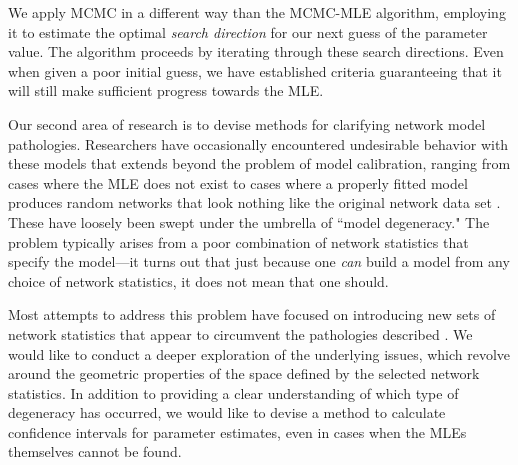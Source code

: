 \documentclass[12pt]{article}
\begin{document}
We apply MCMC in a different way than the MCMC-MLE algorithm, employing it to estimate the optimal \textit{search direction} for our next guess of the parameter value.  The algorithm proceeds by iterating through these search directions.  Even when given a poor initial guess, we have established criteria guaranteeing that it will still make sufficient progress towards the MLE.  


Our second area of research is to devise methods for clarifying network model pathologies.
Researchers have occasionally encountered undesirable behavior with these models that extends beyond the problem of model calibration, ranging from cases where the MLE does not exist to cases where a properly fitted model produces random networks that look nothing like the original network data set \citep{Rinaldo:2009}.  These have loosely been swept under the umbrella of ``model degeneracy."  The problem typically arises from a poor combination of network statistics that specify the model---it turns out that just because one \textit{can} build a model from any choice of network statistics, it does not mean that one should.

Most attempts to address this problem have focused on introducing new sets of network statistics that appear to circumvent the pathologies described \citep{Hunter:2006, Morris:2008}.  We would like to conduct a deeper exploration of the underlying issues, which revolve around the geometric properties of the space defined by the selected network statistics.  In addition to providing a clear understanding of which type of degeneracy has occurred, we would like to devise a method to calculate confidence intervals for parameter estimates, even in cases when the MLEs themselves cannot be found.  

\end{document}
